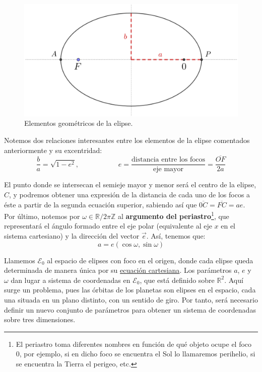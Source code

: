 \documentclass[11pt]{book}
\begin{document}
\begin{figure}[H]
\centering
\includegraphics[scale=0.12]{images/perihelio_afelio.png}
\caption{Elementos geométricos de la elipse.}
\label{fig:perihelio_afelio}
\end{figure}


Notemos dos relaciones interesantes entre los elementos de la elipse comentados anteriormente y su excentridad:
\[
\frac{b}{a}=\sqrt{1-e^2}, \; \; \; \; \; \; \; \; \; \; \; \; \; \; \; \; \; \; \; \; e=\frac{\text{distancia entre los focos}}{\text{eje mayor}}=\frac{\overline{OF}}{2a}
\]

El punto donde se intersecan el semieje mayor y menor será el centro de la elipse, $C$, y podremos obtener una expresión de la distancia de cada uno de los focos a éste a partir de la segunda ecuación superior, sabiendo así que $\overline{0C}=\overline{FC}=ae$.\\

Por último, notemos por $\omega\in\mathbb{R}/2\pi\mathbb{Z}$ al \textbf{argumento del periastro}\footnote{El periastro toma diferentes nombres en función de qué objeto ocupe el foco 0, por ejemplo, si en dicho foco se encuentra el Sol lo llamaremos perihelio, si se encuentra la Tierra el perigeo, etc.}, que representará el ángulo formado entre el eje polar (equivalente al eje $x$ en el sistema cartesiano) y la dirección del vector $\vec{e}$. Así, tenemos que:
\[
a=e(\cos{\omega},\sin{\omega})
\]

Llamemos $\mathcal{E}_0$ al espacio de elipses con foco en el origen, donde cada elipse queda determinada de manera única por su \hyperref[eq:elipse_cartesiana]{ecuación cartesiana}. Los parámetros $a$, $e$ y $\omega$ dan lugar a sistema de coordenadas en $\mathcal{E}_0$, que está definido sobre $\mathbb{R}^2$. Aquí surge un problema, pues las órbitas de los planetas son elipses en el espacio, cada una situada en un plano distinto, con un sentido de giro. Por tanto, será necesario definir un nuevo conjunto de parámetros para obtener un sistema de coordenadas sobre tres dimensiones.\\
\end{document}
